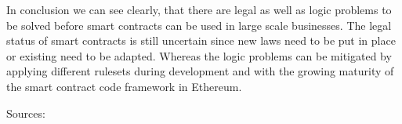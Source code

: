 In conclusion we can see clearly, that there are legal as well as logic problems to be solved before smart contracts can be used in large scale businesses. The legal status of smart contracts is still uncertain since new laws need to be put in place or existing need to be adapted. Whereas the logic problems can be mitigated by applying different rulesets during development and with the growing maturity of the smart contract code framework in Ethereum.

Sources: \newline
{}\newline
{}\newline
{}

\chapterend

